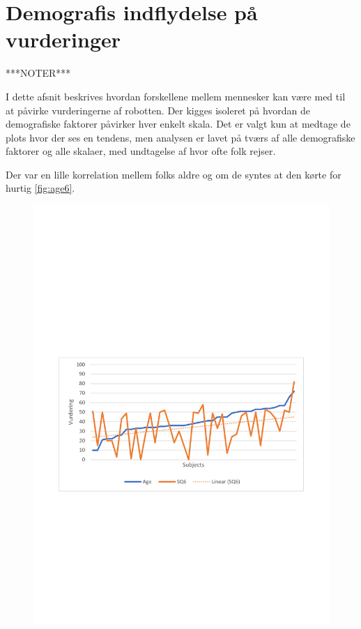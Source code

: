 \section{Demografis indflydelse på vurderinger}
\label{sec:Demografi}
%
***NOTER***

I dette afsnit beskrives hvordan forskellene mellem mennesker kan være med til at påvirke vurderingerne af robotten. Der kigges isoleret på hvordan de demografiske faktorer påvirker hver enkelt skala. Det er valgt kun at medtage de plots hvor der ses en tendens, men analysen er lavet på tværs af alle demografiske faktorer og alle skalaer, med undtagelse af hvor ofte folk rejser.


Der var en lille korrelation mellem folks aldre og om de syntes at den kørte for hurtig \autoref{fig:age6}.

\begin{figure}[H]
\centering
\includegraphics[width=\textwidth]{Figure/DatabehandlingSkalaer/Demografi/age6.pdf}
\caption{}
\label{fig:age6}
\end{figure}
\noindent

